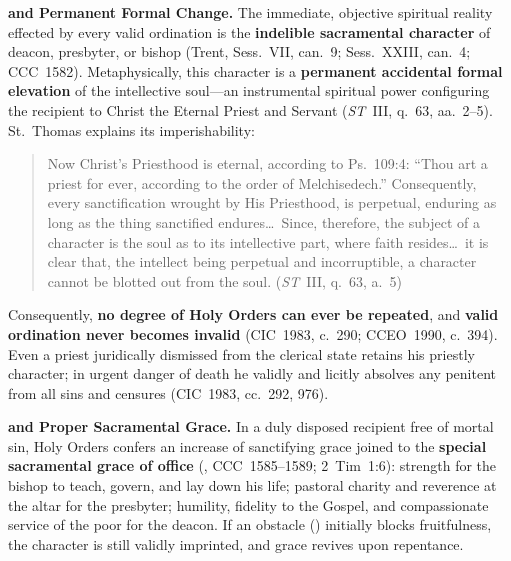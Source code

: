 \textbf{ and Permanent Formal Change.} The immediate, objective spiritual reality effected by every valid ordination is the \textbf{indelible sacramental character} of deacon, presbyter, or bishop (Trent, Sess.~VII, can.~9; Sess.~XXIII, can.~4; CCC~1582). Metaphysically, this character is a \textbf{permanent accidental formal elevation} of the intellective soul---an instrumental spiritual power configuring the recipient to Christ the Eternal Priest and Servant (\emph{ST}~III, q.~63, aa.~2--5). St.~Thomas explains its imperishability:
\begin{quotation}
Now Christ's Priesthood is eternal, according to Ps.~109:4: ``Thou art a priest for ever, according to the order of Melchisedech.'' Consequently, every sanctification wrought by His Priesthood, is perpetual, enduring as long as the thing sanctified endures\ldots\ Since, therefore, the subject of a character is the soul as to its intellective part, where faith resides\ldots\ it is clear that, the intellect being perpetual and incorruptible, a character cannot be blotted out from the soul. (\emph{ST}~III, q.~63, a.~5)
\end{quotation}
Consequently, \textbf{no degree of Holy Orders can ever be repeated}, and \textbf{valid ordination never becomes invalid} (CIC~1983, c.~290; CCEO~1990, c.~394). Even a priest juridically dismissed from the clerical state retains his priestly character; in urgent danger of death he validly and licitly absolves any penitent from all sins and censures (CIC~1983, cc.~292, 976).

\textbf{ and Proper Sacramental Grace.} In a duly disposed recipient free of mortal sin, Holy Orders confers an increase of sanctifying grace joined to the \textbf{special sacramental grace of office} (, CCC~1585--1589; 2~Tim~1:6): strength for the bishop to teach, govern, and lay down his life; pastoral charity and reverence at the altar for the presbyter; humility, fidelity to the Gospel, and compassionate service of the poor for the deacon. If an obstacle () initially blocks fruitfulness, the character is still validly imprinted, and grace revives upon repentance.

